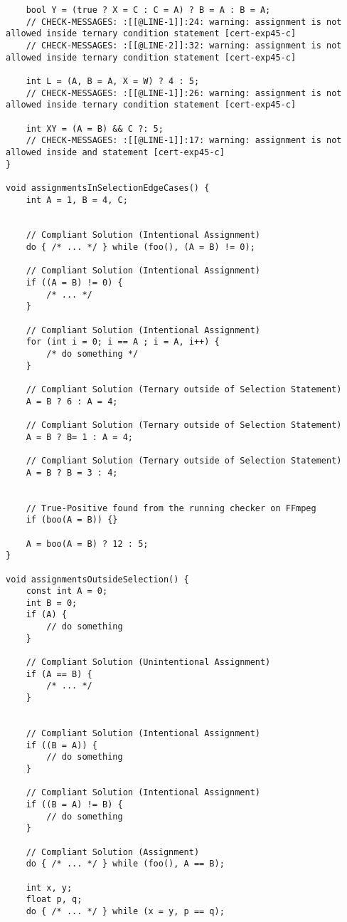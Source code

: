 \begin{code}
\begin{verbatim}
    bool Y = (true ? X = C : C = A) ? B = A : B = A;
    // CHECK-MESSAGES: :[[@LINE-1]]:24: warning: assignment is not allowed inside ternary condition statement [cert-exp45-c]
    // CHECK-MESSAGES: :[[@LINE-2]]:32: warning: assignment is not allowed inside ternary condition statement [cert-exp45-c]

    int L = (A, B = A, X = W) ? 4 : 5; 
    // CHECK-MESSAGES: :[[@LINE-1]]:26: warning: assignment is not allowed inside ternary condition statement [cert-exp45-c]

    int XY = (A = B) && C ?: 5;
    // CHECK-MESSAGES: :[[@LINE-1]]:17: warning: assignment is not allowed inside and statement [cert-exp45-c]
}

void assignmentsInSelectionEdgeCases() {
    int A = 1, B = 4, C;


    // Compliant Solution (Intentional Assignment)
    do { /* ... */ } while (foo(), (A = B) != 0);

    // Compliant Solution (Intentional Assignment)
    if ((A = B) != 0) {
        /* ... */
    }

    // Compliant Solution (Intentional Assignment)
    for (int i = 0; i == A ; i = A, i++) {
        /* do something */
    }

    // Compliant Solution (Ternary outside of Selection Statement)
    A = B ? 6 : A = 4;

    // Compliant Solution (Ternary outside of Selection Statement)
    A = B ? B= 1 : A = 4;

    // Compliant Solution (Ternary outside of Selection Statement)
    A = B ? B = 3 : 4;


    // True-Positive found from the running checker on FFmpeg
    if (boo(A = B)) {}

    A = boo(A = B) ? 12 : 5; 
}

void assignmentsOutsideSelection() {
    const int A = 0;
    int B = 0;
    if (A) {
        // do something 
    }

    // Compliant Solution (Unintentional Assignment)
    if (A == B) {
        /* ... */
    }


    // Compliant Solution (Intentional Assignment)
    if ((B = A)) {
        // do something 
    }

    // Compliant Solution (Intentional Assignment)
    if ((B = A) != B) {
        // do something 
    }

    // Compliant Solution (Assignment)
    do { /* ... */ } while (foo(), A == B); 

    int x, y;
    float p, q;
    do { /* ... */ } while (x = y, p == q);



\end{verbatim}
\end{code}
